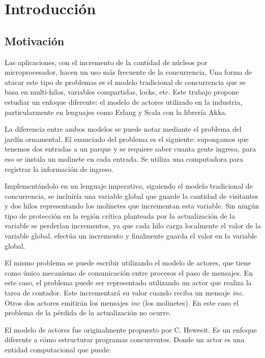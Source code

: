 \chapter{Introducción}

\section{Motivación}

Las aplicaciones, con el incremento de la cantidad de núcleos por microprocesador, hacen un uso más frecuente de la concurrencia. Una forma de atacar este tipo de problemas es el modelo tradicional de concurrencia que se basa en multi-hilos, variables compartidas, locks, etc. Este trabajo propone estudiar un enfoque diferente: el modelo de actores utilizado en la industria, particularmente en lenguajes como Erlang\cite{Cesarini:2009:EP:1717841} y Scala\cite{scala-overview-tech-report} con la librería Akka\cite{Wyatt:2013:AC:2663429}. 

La diferencia entre ambos modelos se puede notar mediante el problema del jardín ornamental. El enunciado del problema es el siguiente: supongamos que tenemos dos entradas a un parque y se requiere saber cuanta gente ingresa, para eso se instala un molinete en cada entrada. Se utiliza una computadora para registrar la información de ingreso.

Implementándolo en un lenguaje imperativo, siguiendo el modelo tradicional de concurrencia, se incluiría una variable global que guarde la cantidad de visitantes y dos hilos representando los molinetes que incrementan esta variable. Sin ningún tipo de protección en la región crítica planteada por la actualización de la variable se perderían incrementos, ya que cada hilo carga localmente el valor de la variable global, efectúa un incremento y finalmente guarda el valor en la variable global. 

El mismo problema se puede escribir utilizando el modelo de actores, que tiene como único mecanismo de comunicación entre procesos el paso de mensajes. En este caso, el problema puede ser representado utilizando un actor que realiza la tarea de contador. Este incrementará su valor cuando reciba un mensaje \emph{inc}. Otros dos actores emitirán los mensajes \emph{inc} (los molinetes). En este caso el problema de la pérdida de la actualización no ocurre.

El modelo de actores fue originalmente propuesto por C. Heweeit\cite{Wyatt:2013:AC:2663429}. Es un enfoque diferente a cómo estructurar programas concurrentes. Donde un actor es una entidad computacional que puede:

